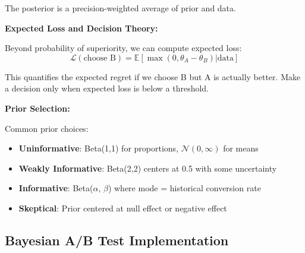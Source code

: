 The posterior is a precision-weighted average of prior and data.

\textbf{Expected Loss and Decision Theory:}

Beyond probability of superiority, we can compute expected loss:
\begin{equation}
\mathcal{L}(\text{choose B}) = \mathbb{E}[\max(0, \theta_A - \theta_B) | \text{data}]
\end{equation}

This quantifies the expected regret if we choose B but A is actually better. Make a decision only when expected loss is below a threshold.

\textbf{Prior Selection:}

Common prior choices:
\begin{itemize}
    \item \textbf{Uninformative}: Beta(1,1) for proportions, $\mathcal{N}(0, \infty)$ for means
    \item \textbf{Weakly Informative}: Beta(2,2) centers at 0.5 with some uncertainty
    \item \textbf{Informative}: Beta($\alpha$, $\beta$) where mode = historical conversion rate
    \item \textbf{Skeptical}: Prior centered at null effect or negative effect
\end{itemize}

\subsection{Bayesian A/B Test Implementation}

